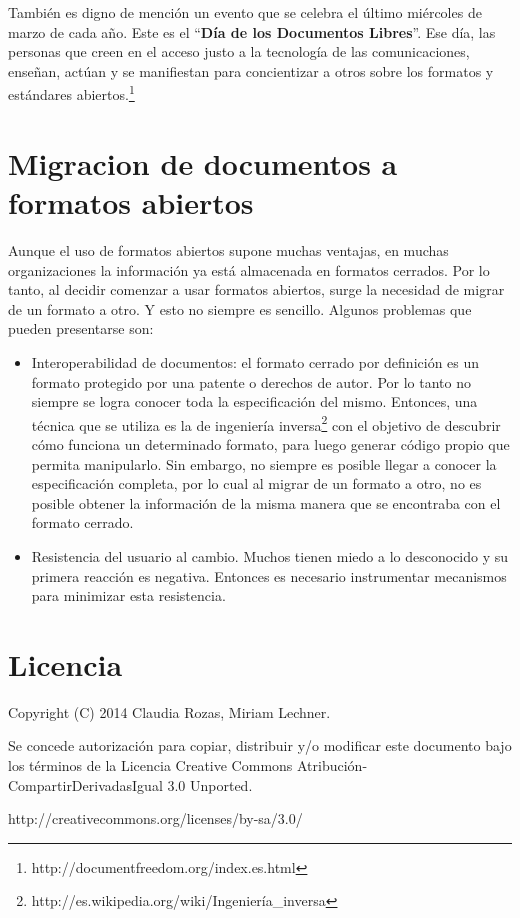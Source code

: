 \documentclass[12pt]{article}
\begin{document}
También es digno de mención un evento que se celebra el último miércoles de marzo de cada año. Este es el ``\textbf{Día de los Documentos Libres}''. Ese día, las personas que creen en el acceso justo a la tecnología de las comunicaciones, enseñan, actúan y se manifiestan para concientizar a otros sobre los formatos y estándares abiertos.\footnote{http://documentfreedom.org/index.es.html}


\section*{Migracion de documentos a formatos abiertos}

Aunque el uso de formatos abiertos supone muchas ventajas, en muchas organizaciones la información ya está almacenada en formatos cerrados. Por lo tanto, al decidir comenzar a usar formatos abiertos, surge la necesidad de migrar de un formato a otro. Y esto no siempre es sencillo. 
Algunos problemas que pueden presentarse son:
\begin{itemize}
\item Interoperabilidad de documentos: el formato cerrado por definición es un formato protegido por una patente o derechos de autor. Por lo tanto no siempre se logra conocer toda la especificación del mismo. Entonces, una técnica que se utiliza es la de ingeniería inversa\footnote{http://es.wikipedia.org/wiki/Ingeniería\_inversa} con el objetivo de descubrir cómo funciona un determinado formato, para luego generar código propio que permita manipularlo. Sin embargo, no siempre es posible llegar a conocer la especificación completa, por lo cual al migrar de un formato a otro, no es posible obtener la información de la misma manera que se encontraba con el formato cerrado.
\item Resistencia del usuario al cambio. Muchos tienen miedo a lo desconocido y su primera reacción es negativa. Entonces es necesario instrumentar mecanismos para minimizar esta resistencia.
\end{itemize}


\section*{Licencia}
Copyright (C) 2014 Claudia Rozas, Miriam Lechner.

Se concede autorización para copiar, distribuir y/o modificar este documento
bajo los términos de la Licencia Creative Commons Atribución-CompartirDerivadasIgual 3.0 Unported. 

http://creativecommons.org/licenses/by-sa/3.0/
\end{document}
